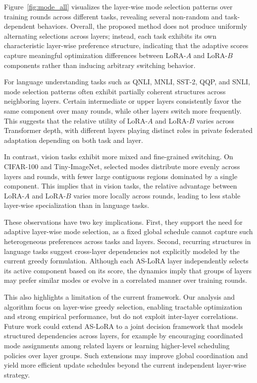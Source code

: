 Figure~\ref{fig:mode_all} visualizes the layer-wise mode selection patterns over training rounds across different tasks, revealing several non-random and task-dependent behaviors. Overall, the proposed method does not produce uniformly alternating selections across layers; instead, each task exhibits its own characteristic layer-wise preference structure, indicating that the adaptive scores capture meaningful optimization differences between LoRA-$A$ and LoRA-$B$ components rather than inducing arbitrary switching behavior.

For language understanding tasks such as QNLI, MNLI, SST-2, QQP, and SNLI, mode selection patterns often exhibit partially coherent structures across neighboring layers. Certain intermediate or upper layers consistently favor the same component over many rounds, while other layers switch more frequently. This suggests that the relative utility of LoRA-$A$ and LoRA-$B$ varies across Transformer depth, with different layers playing distinct roles in private federated adaptation depending on both task and layer.

In contrast, vision tasks exhibit more mixed and fine-grained switching. On CIFAR-100 and Tiny-ImageNet, selected modes distribute more evenly across layers and rounds, with fewer large contiguous regions dominated by a single component. This implies that in vision tasks, the relative advantage between LoRA-$A$ and LoRA-$B$ varies more locally across rounds, leading to less stable layer-wise specialization than in language tasks.

These observations have two key implications. First, they support the need for adaptive layer-wise mode selection, as a fixed global schedule cannot capture such heterogeneous preferences across tasks and layers. Second, recurring structures in language tasks suggest cross-layer dependencies not explicitly modeled by the current greedy formulation. Although each AS-LoRA layer independently selects its active component based on its score, the dynamics imply that groups of layers may prefer similar modes or evolve in a correlated manner over training rounds.

This also highlights a limitation of the current framework. Our analysis and algorithm focus on layer-wise greedy selection, enabling tractable optimization and strong empirical performance, but do not exploit inter-layer correlations. Future work could extend AS-LoRA to a joint decision framework that models structured dependencies across layers, for example by encouraging coordinated mode assignments among related layers or learning higher-level scheduling policies over layer groups. Such extensions may improve global coordination and yield more efficient update schedules beyond the current independent layer-wise strategy.

